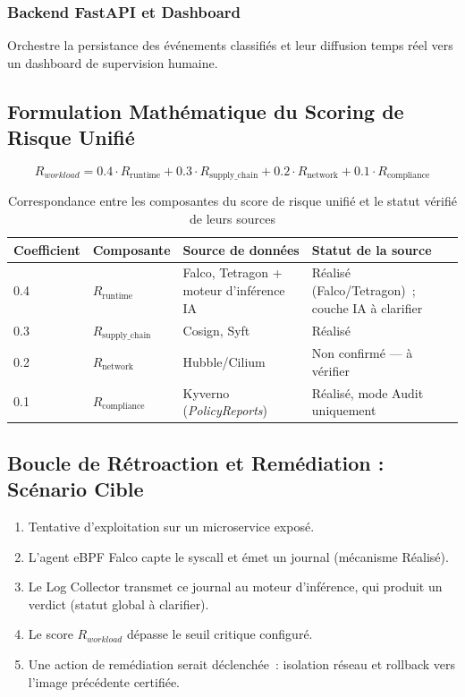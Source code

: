 \subsubsection{Backend FastAPI et Dashboard}
Orchestre la persistance des événements classifiés et leur diffusion temps réel vers un dashboard de supervision humaine.

\subsection{Formulation Mathématique du Scoring de Risque Unifié}

\begin{equation}
R_{workload} = 0.4 \cdot R_{\text{runtime}} + 0.3 \cdot R_{\text{supply\_chain}} + 0.2 \cdot R_{\text{network}} + 0.1 \cdot R_{\text{compliance}}
\end{equation}

\begin{table}[htbp]
\centering
\scriptsize
\begin{tabular}{@{}p{1.6cm}p{2.6cm}p{4cm}p{4.5cm}@{}}
\toprule
\textbf{Coefficient} & \textbf{Composante} & \textbf{Source de données} & \textbf{Statut de la source} \\
\midrule
0.4 & $R_{\text{runtime}}$ & Falco, Tetragon + moteur d'inférence IA & Réalisé (Falco/Tetragon)~; couche IA à clarifier \\
0.3 & $R_{\text{supply\_chain}}$ & Cosign, Syft & Réalisé \\
0.2 & $R_{\text{network}}$ & Hubble/Cilium & Non confirmé — à vérifier \\
0.1 & $R_{\text{compliance}}$ & Kyverno (\textit{PolicyReports}) & Réalisé, mode Audit uniquement \\
\bottomrule
\end{tabular}
\caption{Correspondance entre les composantes du score de risque unifié et le statut vérifié de leurs sources}
\label{tab:risk_components}
\end{table}


\subsection{Boucle de Rétroaction et Remédiation : Scénario Cible}

\begin{enumerate}
    \item Tentative d'exploitation sur un microservice exposé.
    \item L'agent eBPF Falco capte le syscall et émet un journal (mécanisme Réalisé).
    \item Le Log Collector transmet ce journal au moteur d'inférence, qui produit un verdict (statut global à clarifier).
    \item Le score $R_{workload}$ dépasse le seuil critique configuré.
    \item Une action de remédiation serait déclenchée~: isolation réseau et rollback vers l'image précédente certifiée.
\end{enumerate}


